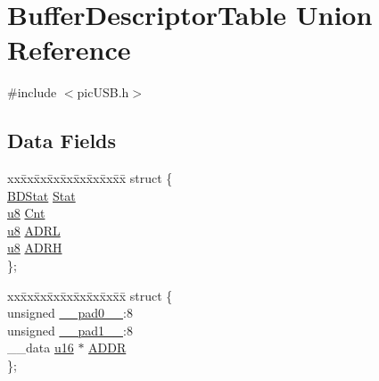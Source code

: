 \hypertarget{union_buffer_descriptor_table}{\section{Buffer\-Descriptor\-Table Union Reference}
\label{union_buffer_descriptor_table}
}


{\ttfamily \#include $<$pic\-U\-S\-B.\-h$>$}

\subsection*{Data Fields}
\begin{DoxyCompactItemize}
\item 
\begin{tabbing}
xx\=xx\=xx\=xx\=xx\=xx\=xx\=xx\=xx\=\kill
struct \{\\
\>\hyperlink{union_b_d_stat}{BDStat} \hyperlink{union_buffer_descriptor_table_a6cd0cf5f5c11f77a2597bd70e392b4b8}{Stat}\\
\>\hyperlink{p8_2pinguino_2core_2typedef_8h_aed742c436da53c1080638ce6ef7d13de}{u8} \hyperlink{union_buffer_descriptor_table_a9cb3e00771d7b26cb7d86fc95aa48492}{Cnt}\\
\>\hyperlink{p8_2pinguino_2core_2typedef_8h_aed742c436da53c1080638ce6ef7d13de}{u8} \hyperlink{union_buffer_descriptor_table_a77e1802393acbdeaa4cb4b03cd835812}{ADRL}\\
\>\hyperlink{p8_2pinguino_2core_2typedef_8h_aed742c436da53c1080638ce6ef7d13de}{u8} \hyperlink{union_buffer_descriptor_table_a4a0bc5412324724c0f8ee123276dc88b}{ADRH}\\
\}; \\

\end{tabbing}\item 
\begin{tabbing}
xx\=xx\=xx\=xx\=xx\=xx\=xx\=xx\=xx\=\kill
struct \{\\
\>unsigned \hyperlink{union_buffer_descriptor_table_adf71f3d8410c1f1dbbc96680a92c49af}{\_\_pad0\_\_}:8\\
\>unsigned \hyperlink{union_buffer_descriptor_table_acaf2d0924a107ec6e8d2e31febaf66f9}{\_\_pad1\_\_}:8\\
\>\_\_data \hyperlink{p8_2pinguino_2core_2typedef_8h_a50b0d1c7a54fa09a64a3ac111c778520}{u16} $\ast$ \hyperlink{union_buffer_descriptor_table_ae370db99fcc6c8e4871c20ccfb6959f3}{ADDR}\\
\}; \\


\end{tabbing}
\end{DoxyCompactItemize}
